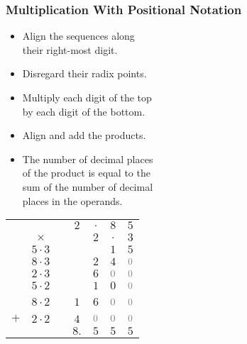 \begin{frame}

\frametitle{Multiplication With Positional Notation}

\vspace{\fill}

\begin{minipage}{0.7\textwidth}

\begin{itemize}

\item Align the sequences along \\ their right-most digit.

\item Disregard their radix points.

\item Multiply each digit of the top \\ by each digit of the bottom.

\item Align and add the products.

\item The number of decimal places \\ of the product is equal to the \\ sum of
the number of decimal \\ places in the operands.

\end{itemize}

\end{minipage}%
\begin{minipage}[t]{0.3\textwidth}

{\setlength{\tabcolsep}{1pt}
\begin{tabular}{ccccccc}
&          && $2$ & $.$ & $8$ & $5$  \\
&$\times$  && &   $2$ & $.$ & $3$  \\ \hline
&{\scriptsize $5\cdot 3$} && & & $1$ & $5$ \\
&{\scriptsize $8\cdot 3$} && & $2$ & $4$ & ${\color{gray}0}$ \\
&{\scriptsize $2\cdot 3$} && & $6$ & ${\color{gray}0}$ & ${\color{gray}0}$ \\
&{\scriptsize $5\cdot 2$} && & $1$ & $0$ & ${\color{gray}0}$ \\\
&{\scriptsize $8\cdot 2$} && $1$ & $6$ & ${\color{gray}0}$ & ${\color{gray}0}$ \\
$+$ &{\scriptsize $2\cdot 2$} && $4$ & ${\color{gray}0}$ & ${\color{gray}0}$ & ${\color{gray}0}$ \\
\hline
&& & $8.$ & $5$ & $5$ & $5$
\end{tabular}
}

\end{minipage}

\vspace{\fill}

\end{frame}
